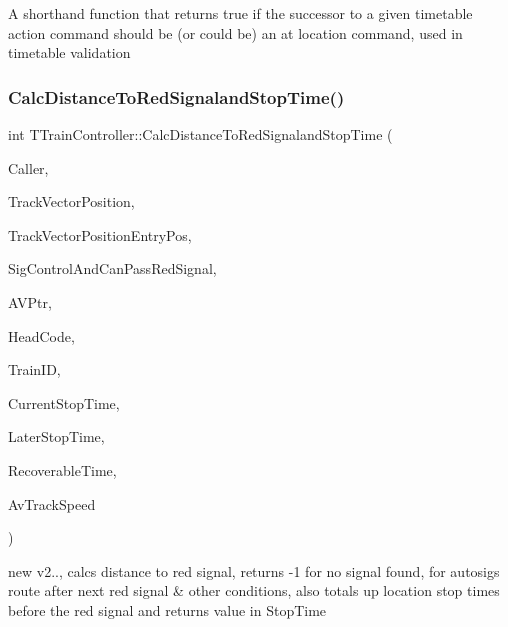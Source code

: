 A shorthand function that returns true if the successor to a given timetable action command should be (or could be) an \textquotesingle{}at location\textquotesingle{} command, used in timetable validation \mbox{\label{class_t_train_controller_ad81afe17a036ab3f96c340ab75a2d8e2}} 
\subsubsection{\texorpdfstring{Calc\+Distance\+To\+Red\+Signaland\+Stop\+Time()}{CalcDistanceToRedSignalandStopTime()}}
{\footnotesize\ttfamily int T\+Train\+Controller\+::\+Calc\+Distance\+To\+Red\+Signaland\+Stop\+Time (\begin{DoxyParamCaption}\item[{int}]{Caller,  }\item[{int}]{Track\+Vector\+Position,  }\item[{int}]{Track\+Vector\+Position\+Entry\+Pos,  }\item[{bool}]{Sig\+Control\+And\+Can\+Pass\+Red\+Signal,  }\item[{\mbox{\hyperlink{class_t_action_vector_entry}{T\+Action\+Vector\+Entry}} $\ast$}]{A\+V\+Ptr,  }\item[{Ansi\+String}]{Head\+Code,  }\item[{int}]{Train\+ID,  }\item[{float \&}]{Current\+Stop\+Time,  }\item[{float \&}]{Later\+Stop\+Time,  }\item[{float \&}]{Recoverable\+Time,  }\item[{int \&}]{Av\+Track\+Speed }\end{DoxyParamCaption})}

new v2.., calcs distance to red signal, returns -\/1 for no signal found, for autosigs route after next red signal \& other conditions, also totals up location stop times before the red signal and returns value in Stop\+Time \mbox{\label{class_t_train_controller_aadffada34a23350d7773bc7735e423a1}} 
